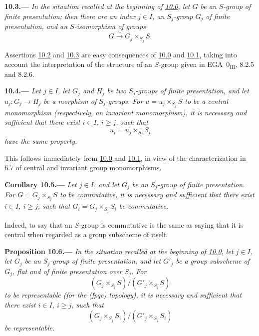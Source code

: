 
\medskip
{}\label{lem:sga3-VIB-10.3}%
\noindent\textbf{10.3.---}
\emph{In the situation recalled at the beginning of
\hyperref[par:sga3-VIB-10.0]{10.0}, let \(G\) be an \(S\)-group of
finite presentation; then there are an index \(j\in I\), an
\(S_j\)-group \(G_j\) of finite presentation, and an
\(S\)-isomorphism of groups}
\[
  G\xrightarrow{\ \sim\ }G_j\times_{S_j}S.
\]

Assertions \hyperref[lem:sga3-VIB-10.2]{10.2} and
\hyperref[lem:sga3-VIB-10.3]{10.3} are easy consequences of
\hyperref[par:sga3-VIB-10.0]{10.0} and
\hyperref[par:sga3-VIB-10.1]{10.1}, taking into account the
interpretation
of the structure of an \(S\)-group given in EGA~0\(_{\mathrm{III}}\),
8.2.5 and 8.2.6.

\medskip
{}\label{lem:sga3-VIB-10.4}%
\noindent\textbf{10.4.---}
\emph{Let \(j\in I\), let \(G_j\) and \(H_j\) be two
\(S_j\)-groups of finite presentation, and let
\(u_j:G_j\to H_j\) be a morphism of \(S_j\)-groups. For
\(u=u_j\times_{S_j}S\) to be a central monomorphism
\textup{(respectively, an invariant monomorphism)}, it is
necessary and sufficient that there exist \(i\in I\),
\(i\geq j\), such that}
\label{form:sga3-VIB-10.4-base-change}%
\[
  u_i=u_j\times_{S_j}S_i
\]
\emph{have the same property.}

This follows immediately from
\hyperref[par:sga3-VIB-10.0]{10.0} and
\hyperref[par:sga3-VIB-10.1]{10.1}, in view of the
characterization in \hyperref[rem:sga3-VIB-6.7]{6.7} of
central and invariant group monomorphisms.

\medskip
{}\label{cor:sga3-VIB-10.5}%
\noindent\textbf{Corollary 10.5.---}
\emph{Let \(j\in I\), and let \(G_j\) be an \(S_j\)-group of
finite presentation. For \(G=G_j\times_{S_j}S\) to be
commutative, it is necessary and sufficient that there exist
\(i\in I\), \(i\geq j\), such that
\(G_i=G_j\times_{S_j}S_i\) be commutative.}

Indeed, to say that an \(S\)-group is commutative is the same
as saying that it is central when regarded as a group
subscheme of itself.

\medskip
{}\label{prop:sga3-VIB-10.6}%
\noindent\textbf{Proposition 10.6.---}
\emph{In the situation recalled at the beginning of
\hyperref[par:sga3-VIB-10.0]{10.0}, let \(j\in I\), let \(G_j\)
be an \(S_j\)-group of finite presentation, and let \(G'_j\) be
a group subscheme of \(G_j\), flat and of finite presentation
over \(S_j\). For}
\label{form:sga3-VIB-10.6-quotient-over-S}%
\[
  (G_j\times_{S_j}S)/(G'_j\times_{S_j}S)
\]
\emph{to be representable \textup{(for the (fpqc) topology)}, it
is necessary and sufficient that there exist \(i\in I\),
\(i\geq j\), such that}
\label{form:sga3-VIB-10.6-quotient-over-Si}%
\[
  (G_j\times_{S_j}S_i)/(G'_j\times_{S_j}S_i)
\]
\emph{be representable.}

